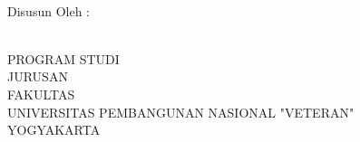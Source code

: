 % 

% 

\begin{titlepage}
  \begin{center}
    \vspace*{0cm}
    \ThesisTitle \\
    
    \vspace*{1cm}
    \Tipe
    \vspace*{2.5cm}

    \UniversityLogo
    \vspace*{2.5cm}

    \normalfont\normalsize

    Disusun Oleh :\\
    \underline{\penulis}\\
    \nim
    \vspace*{2.5cm}

    PROGRAM STUDI \Prodi\\
    JURUSAN \Jurusan\\
    FAKULTAS \Fakultas\\
    UNIVERSITAS PEMBANGUNAN NASIONAL "VETERAN"\\
    YOGYAKARTA\\
    \tahun


  \end{center}
\end{titlepage}